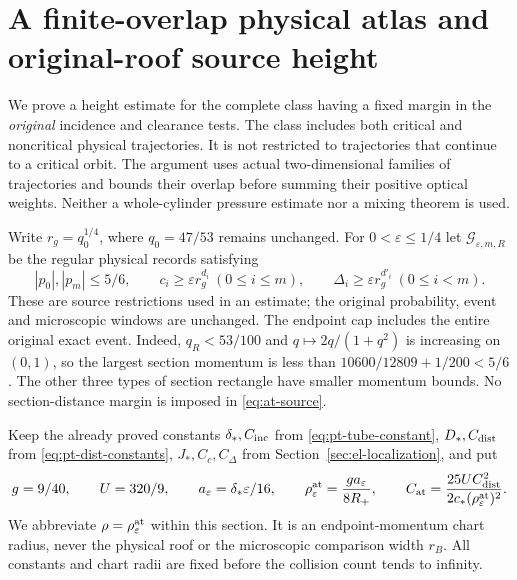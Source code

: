 \section{A finite-overlap physical atlas and original-roof source height}
\label{sec:at-atlas}
We prove a height estimate for the complete class having a fixed
margin in the \emph{original} incidence and clearance tests.  The
class includes both critical and noncritical physical trajectories.
It is not restricted to trajectories that continue to a critical
orbit.  The argument uses actual two-dimensional families of
trajectories and bounds their overlap before summing their positive
optical weights.  Neither a whole-cylinder pressure estimate nor a
mixing theorem is used.

Write $r_g=q_0^{1/4}$, where $q_0=47/53$ remains unchanged.
For $0<\varepsilon\le1/4$ let $\mathcal G_{\varepsilon,m,R}$ be
the regular physical records satisfying
\begin{equation}\label{eq:at-source}
 |p_0|,|p_m|\le5/6,\qquad
 c_i\ge\varepsilon r_g^{d_i}\ (0\le i\le m),\qquad
 \Delta_i\ge\varepsilon r_g^{d'_i}\ (0\le i<m).
\end{equation}
These are source restrictions used in an estimate; the original
probability, event and microscopic windows are unchanged.  The
endpoint cap includes the entire original exact event.  Indeed,
$q_R<53/100$ and $q\mapsto2q/(1+q^2)$ is increasing on $(0,1)$,
so the largest section momentum is less than
$10600/12809+1/200<5/6$.  The other three types of section rectangle
have smaller momentum bounds.  No section-distance margin is
imposed in \eqref{eq:at-source}.

Keep the already proved constants $\delta_*,C_{\rm inc}$ from
\eqref{eq:pt-tube-constant}, $D_*,C_{\rm dist}$ from
\eqref{eq:pt-dist-constants}, $J_*,C_c,C_\Delta$ from
Section~\ref{sec:el-localization}, and put
\begin{equation}\label{eq:at-constants}
 g=9/40,\qquad U=320/9,\qquad
 a_\varepsilon=\delta_*\varepsilon/16,\qquad
 \rho_\varepsilon^{\rm at}=\frac{g a_\varepsilon}{8R_+},\qquad
 C_{\rm at}=\frac{25U C_{\rm dist}^2}
                   {2c_*(\rho_\varepsilon^{\rm at})^2}.
\end{equation}
We abbreviate $\rho=\rho_\varepsilon^{\rm at}$ within this section.
It is an endpoint-momentum chart radius, never the physical roof or
the microscopic comparison width $r_B$.  All constants and chart
radii are fixed before the collision count tends to infinity.

